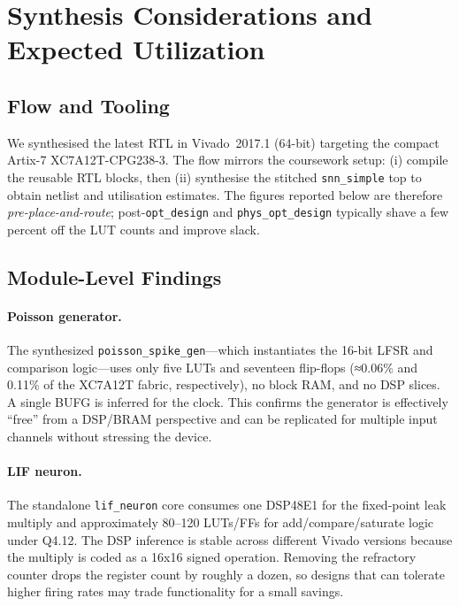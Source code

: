 \documentclass[10pt,onecolumn]{IEEEtran}
\begin{document}
\FloatBarrier %


\section{Synthesis Considerations and Expected Utilization}
\label{sec:synthesis}

\subsection{Flow and Tooling}
We synthesised the latest RTL in Vivado~2017.1 (64-bit) targeting the compact Artix-7 XC7A12T-CPG238-3. The flow mirrors the coursework setup: (i) compile the reusable RTL blocks, then (ii) synthesise the stitched \texttt{snn\_simple} top to obtain netlist and utilisation estimates. The figures reported below are therefore \emph{pre-place-and-route}; post-\texttt{opt\_design} and \texttt{phys\_opt\_design} typically shave a few percent off the LUT counts and improve slack.

\subsection{Module-Level Findings}
\paragraph{Poisson generator.} The synthesized \texttt{poisson\_spike\_gen}—which instantiates the 16-bit LFSR and comparison logic—uses only five LUTs and seventeen flip-flops (≈0.06\% and 0.11\% of the XC7A12T fabric, respectively), no block RAM, and no DSP slices. A single BUFG is inferred for the clock. This confirms the generator is effectively “free” from a DSP/BRAM perspective and can be replicated for multiple input channels without stressing the device.

\paragraph{LIF neuron.} The standalone \texttt{lif\_neuron} core consumes one DSP48E1 for the fixed-point leak multiply and approximately 80–120 LUTs/FFs for add/compare/saturate logic under Q4.12. The DSP inference is stable across different Vivado versions because the multiply is coded as a 16x16 signed operation. Removing the refractory counter drops the register count by roughly a dozen, so designs that can tolerate higher firing rates may trade functionality for a small savings.
\end{document}
